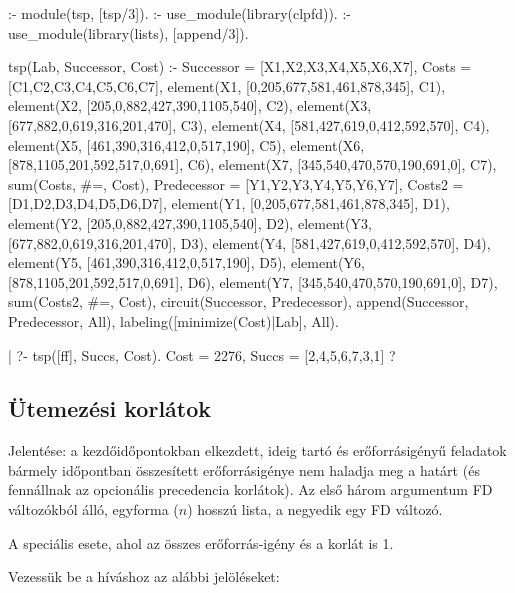 \begin{prologcode}
:- module(tsp, [tsp/3]).
:- use_module(library(clpfd)).
:- use_module(library(lists), [append/3]).

tsp(Lab, Successor, Cost) :-
        Successor = [X1,X2,X3,X4,X5,X6,X7],
        Costs = [C1,C2,C3,C4,C5,C6,C7],
        element(X1, [0,205,677,581,461,878,345], C1),
        element(X2, [205,0,882,427,390,1105,540], C2),
        element(X3, [677,882,0,619,316,201,470], C3),
        element(X4, [581,427,619,0,412,592,570], C4),
        element(X5, [461,390,316,412,0,517,190], C5),
        element(X6, [878,1105,201,592,517,0,691], C6),
        element(X7, [345,540,470,570,190,691,0], C7),
        sum(Costs, #=, Cost),
        Predecessor = [Y1,Y2,Y3,Y4,Y5,Y6,Y7],
        Costs2 = [D1,D2,D3,D4,D5,D6,D7],
        element(Y1, [0,205,677,581,461,878,345], D1),
        element(Y2, [205,0,882,427,390,1105,540], D2),
        element(Y3, [677,882,0,619,316,201,470], D3),
        element(Y4, [581,427,619,0,412,592,570], D4),
        element(Y5, [461,390,316,412,0,517,190], D5),
        element(Y6, [878,1105,201,592,517,0,691], D6),
        element(Y7, [345,540,470,570,190,691,0], D7),
        sum(Costs2, #=, Cost),
        circuit(Successor, Predecessor),
        append(Successor, Predecessor, All),
        labeling([minimize(Cost)|Lab], All).

| ?- tsp([ff], Succs, Cost).
Cost = 2276, Succs = [2,4,5,6,7,3,1] ?
\end{prologcode}

\subsection{Ütemezési korlátok}

{}

Jelentése: a  kezdőidőpontokban elkezdett,  ideig tartó
és  erőforrásigényű feladatok bármely időpontban összesített
erőforrásigénye nem haladja meg a  határt (és fennállnak az opcionális
precedencia korlátok). Az első három argumentum FD változókból álló, egyforma ($n$)
hosszú lista, a negyedik egy FD változó.

\medskip

{}

A  speciális esete, ahol az összes erőforrás-igény és a korlát is 1.

\br
Vezessük be a  híváshoz az alábbi jelöléseket:

